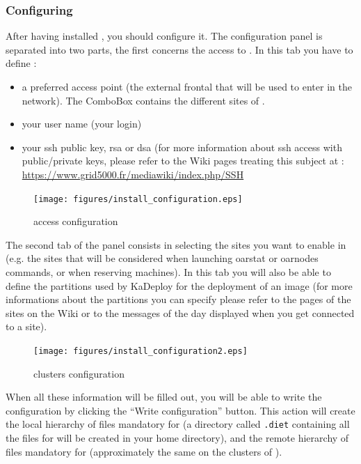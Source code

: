 \subsubsection{Configuring \grudu}
After having installed \grudu, you should configure it. The
configuration panel is separated into two parts, the first concerns the access
to \gfk. In this tab you have to define :\\
\begin{itemize}
  \item a preferred access point (the external frontal that will be used to
  enter in the \gfk network). The ComboBox contains the different sites of \gfk.
  \item your user name (your \gfk login)
  \item your ssh public key, rsa or dsa (for more information about ssh access
  with public/private keys, please refer to the \gfk Wiki pages treating this subject at :\\
  \url{https://www.grid5000.fr/mediawiki/index.php/SSH}
\end{itemize}
\begin{figure}[H]
\begin{center}
\texttt{[image: figures/install\_configuration.eps]}
\caption{\gfk access configuration}
\end{center}
\end{figure}

The second tab of the panel consists in selecting the sites you want
to enable in \grudu (e.g. the sites that will be considered when launching
oarstat or oarnodes commands, or when reserving machines). In this tab you will
also be able to define the partitions used by KaDeploy for the deployment of an
image (for more informations about the partitions you can specify please refer
to the pages of the sites on the \gfk Wiki or to the messages of the day
displayed when you get connected to a site).\\
\begin{figure}[H]
\begin{center}
\texttt{[image: figures/install\_configuration2.eps]}
\caption{\gfk clusters configuration}
\end{center}
\end{figure}

When all these information will be filled out, you will be able to write the
configuration by clicking the ``Write configuration'' button. This action will
create the local hierarchy of files mandatory for \grudu (a directory called
\texttt{.diet} containing all the files for \grudu will be created in your home
directory), and the remote hierarchy of files mandatory for \grudu (approximately
the same on the clusters of \gfk).


